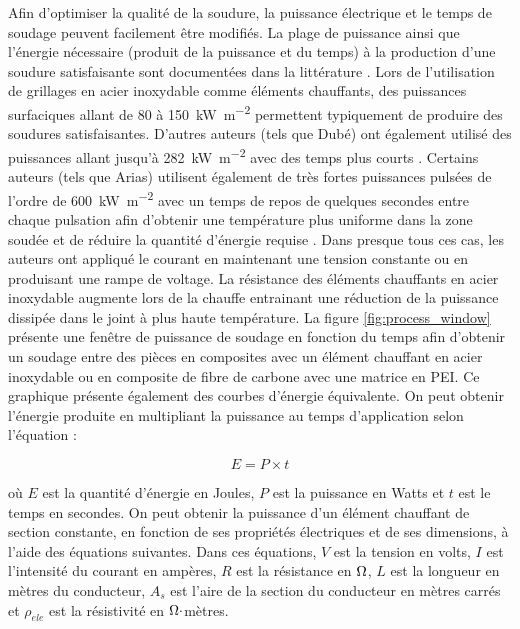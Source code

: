 \FloatBarrier
Afin d'optimiser la qualité de la soudure, la puissance électrique et le temps de soudage peuvent facilement être modifiés. 
La plage de puissance ainsi que l'énergie nécessaire (produit de la puissance et du temps) à la production d'une soudure satisfaisante sont documentées dans la littérature \cite{Hou1999a}. 
Lors de l'utilisation de grillages en acier inoxydable comme éléments chauffants, des puissances surfaciques allant de 80 à \SI[locale=FR]{150}{\kilo\watt\per\square\metre} permettent typiquement de produire des soudures satisfaisantes. 
D'autres auteurs (tels que Dubé) ont également utilisé des puissances allant jusqu'à \SI[locale=FR]{282}{\kilo\watt\per\square\metre} avec des temps plus courts \cite{Dube2007}. 
Certains auteurs (tels que Arias) utilisent également de très fortes puissances pulsées de l'ordre de \SI[locale=FR]{600}{\kilo\watt\per\square\metre} avec un temps de repos de quelques secondes entre chaque pulsation afin d'obtenir une température plus uniforme dans la zone soudée et de réduire la quantité d'énergie requise  \cite{Arias1996}. 
Dans presque tous ces cas, les auteurs ont appliqué le courant en maintenant une tension constante ou en produisant une rampe de voltage. 
La résistance des éléments chauffants en acier inoxydable augmente lors de la chauffe entrainant une réduction de la puissance dissipée dans le joint à plus haute température. 
La figure \ref{fig:process_window} présente une fenêtre de puissance de soudage en fonction du temps afin d'obtenir un soudage entre des pièces en composites avec un élément chauffant en acier inoxydable ou en composite de fibre de carbone avec une matrice en PEI. 
Ce graphique présente également des courbes d'énergie équivalente. 
On peut obtenir l'énergie produite en multipliant la puissance au temps d'application selon l'équation : 

\begin{equation}
E = P \times t
\end{equation}

où $E$ est la quantité d'énergie en Joules, $P$ est la puissance en Watts et $t$ est le temps en secondes. 
On peut obtenir la puissance d'un élément chauffant de section constante, en fonction de ses propriétés électriques et de ses dimensions, à l'aide des équations suivantes. Dans ces équations, $V$ est la tension en volts, $I$ est l'intensité du courant en ampères, $R$ est la résistance en $\ohm$, $L$ est la longueur en mètres du conducteur, $A_s$ est l'aire de la section du conducteur en mètres carrés et $\rho_{ele}$ est la résistivité en $\ohm \cdot$mètres. 

